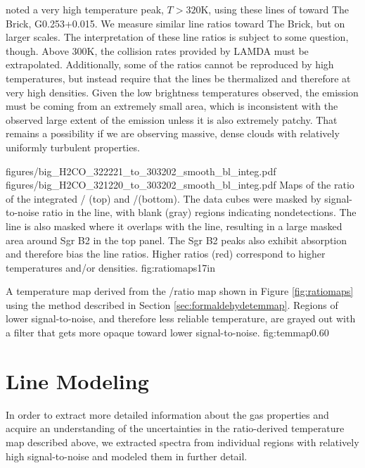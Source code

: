 \citet{Johnston2014a} noted a very high temperature peak, $T>320$K, using these
lines of \formaldehyde toward The Brick, G0.253+0.015.  We measure similar line
ratios toward The Brick, but on larger scales.  The interpretation of these
line ratios is subject to some question, though.  Above 300K, the collision
rates provided by LAMDA \citep{Schoier2005a,Wiesenfeld2013a} must be
extrapolated.  Additionally, some of the ratios cannot be reproduced by high
temperatures, but instead require that the lines be thermalized and therefore
at very high densities.   Given the low brightness temperatures observed,
the emission must be coming from an extremely small area, which is inconsistent
with the observed large extent of the emission unless it is also extremely
patchy.  That remains a possibility if we are observing massive, dense clouds
with relatively uniformly turbulent properties.

\FigureTwoAA
{figures/big_H2CO_322221_to_303202_smooth_bl_integ.pdf}
{figures/big_H2CO_321220_to_303202_smooth_bl_integ.pdf}
{Maps of the ratio of the integrated \para \threetwotwo / \threeohthree (top)
and \threetwoone/\threeohthree (bottom).  The data cubes were masked by
signal-to-noise ratio in the \threeohthree line, with blank (gray) regions
indicating nondetections.  The \threetwotwo line is also masked where it
overlaps with the \methanol \fourtwotwo line, resulting in a large masked area
around Sgr B2 in the top panel.  The Sgr B2 peaks also exhibit \formaldehyde absorption and therefore
bias the line ratios.  Higher ratios (red) correspond to higher
temperatures and/or densities.  
}
{fig:ratiomaps}{1}{7in}

{A temperature map derived from the \threetwoone/\threeohthree ratio map shown
in Figure \ref{fig:ratiomaps} using the method described in Section
\ref{sec:formaldehydetemmap}.  Regions of lower signal-to-noise, and therefore less
reliable temperature, are grayed out with a filter that gets more opaque
toward lower signal-to-noise.
}
{fig:temmap}{0.6}{0}

\section{Line Modeling}
\label{sec:linemodeling}
In order to extract more detailed information about the gas properties and
acquire an understanding of the uncertainties in the ratio-derived
temperature map described above, we extracted spectra from individual regions
with relatively high signal-to-noise and modeled them in further detail.


